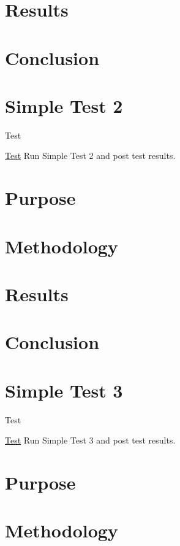 \section*{Results}

\section*{Conclusion}\hypertarget{SimpleTest2}{}\section{Simple Test 2}\label{SimpleTest2}
\begin{DoxyRefDesc}{Test}
\item[\hyperlink{test__test000006}{Test}]Run Simple Test 2 and post test results.\end{DoxyRefDesc}


\section*{Purpose}

\section*{Methodology}

\section*{Results}

\section*{Conclusion}\hypertarget{SimpleTest3}{}\section{Simple Test 3}\label{SimpleTest3}
\begin{DoxyRefDesc}{Test}
\item[\hyperlink{test__test000007}{Test}]Run Simple Test 3 and post test results.\end{DoxyRefDesc}


\section*{Purpose}

\section*{Methodology}


